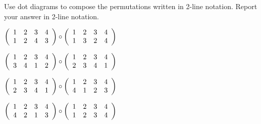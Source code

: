 \begin{exer}[\exerP] %
\label{exer_perms_compose}
    Use dot diagrams to compose the permutations written in 2-line notation.  Report your answer in 2-line notation.
        \begin{exerpart}
            \item $\displaystyle \left ( \begin{array} {ccc c} 1 & 2 & 3 & 4 \\ 1 & 2 & 4 & 3\\ \end{array} \right ) \circ \displaystyle \left ( \begin{array} {ccc c} 1 & 2 & 3 & 4 \\ 1 & 3 & 2 & 4\\ \end{array} \right )$
            \item $\displaystyle \left ( \begin{array} {ccc c} 1 & 2 & 3 & 4 \\ 3 & 4 & 1 & 2\\ \end{array} \right ) \circ \displaystyle \left ( \begin{array} {ccc c} 1 & 2 & 3 & 4 \\ 2 & 3 & 4 & 1\\ \end{array} \right )$
            \item $\displaystyle \left ( \begin{array} {ccc c} 1 & 2 & 3 & 4 \\ 2 & 3 & 4 & 1\\ \end{array} \right ) \circ \displaystyle \left ( \begin{array} {ccc c} 1 & 2 & 3 & 4 \\ 4 & 1 & 2 & 3 \\ \end{array} \right )$
            \item $\displaystyle \left ( \begin{array} {ccc c} 1 & 2 & 3 & 4 \\ 4 & 2 & 1 & 3\\ \end{array} \right ) \circ \displaystyle \left ( \begin{array} {ccc c} 1 & 2 & 3 & 4 \\1 & 2 & 3 & 4\\ \end{array} \right )$
        \end{exerpart}        
\end{exer}

